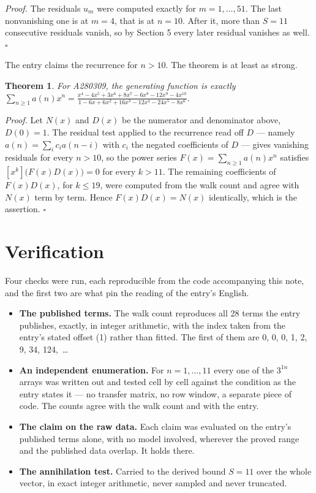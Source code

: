 \documentclass[11pt]{article}
\newtheorem{theorem}{Theorem}
\theoremstyle{definition}
\begin{document}
{\itshape Proof.} The residuals $u_m$ were computed exactly for $m = 1,\dots,51$. The last nonvanishing one is at $m = 4$, that is at $n = 10$. After it, more than $S = 11$ consecutive residuals vanish, so by Section 5 every later residual vanishes as well. $\square$

The entry claims the recurrence for $n > 10$. The theorem is at least as strong.

\begin{theorem} For A280309, the generating function is exactly $\sum_{n\ge 1} a(n)x^n = \frac{x^{4} - 4x^{5} + 3x^{6} + 8x^{7} - 6x^{8} - 12x^{9} - 4x^{10}}{1 - 6x + 6x^{2} + 16x^{3} - 12x^{4} - 24x^{5} - 8x^{6}}$.\end{theorem}

{\itshape Proof.} Let $N(x)$ and $D(x)$ be the numerator and denominator above, $D(0)=1$. The residual test applied to the recurrence read off $D$ --- namely $a(n) = \sum_i c_i a(n-i)$ with $c_i$ the negated coefficients of $D$ --- gives vanishing residuals for every $n > 10$, so the power series $F(x)=\sum_{n\ge 1}a(n)x^n$ satisfies $[x^k]\bigl(F(x)D(x)\bigr) = 0$ for every $k > 11$. The remaining coefficients of $F(x)D(x)$, for $k \le 19$, were computed from the walk count and agree with $N(x)$ term by term. Hence $F(x)D(x) = N(x)$ identically, which is the assertion. $\square$

\section{Verification}

Four checks were run, each reproducible from the code accompanying this note, and the first two are what pin the reading of the entry's English.

\begin{itemize}

\item {\bfseries The published terms.} The walk count reproduces all 28 terms the entry publishes, exactly, in integer arithmetic, with the index taken from the entry's stated offset (1) rather than fitted. The first of them are 0, 0, 0, 1, 2, 9, 34, 124,~\dots

\item {\bfseries An independent enumeration.} For $n = 1,\dots,11$ every one of the $3^{1n}$ arrays was written out and tested cell by cell against the condition as the entry states it --- no transfer matrix, no row window, a separate piece of code. The counts agree with the walk count and with the entry.

\item {\bfseries The claim on the raw data.} Each claim was evaluated on the entry's published terms alone, with no model involved, wherever the proved range and the published data overlap. It holds there.

\item {\bfseries The annihilation test.} Carried to the derived bound $S = 11$ over the whole vector, in exact integer arithmetic, never sampled and never truncated.

\end{itemize}
\end{document}
